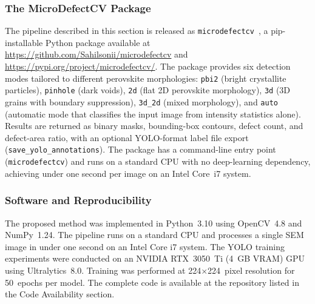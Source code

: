 \documentclass[pdflatex,sn-mathphys-num,iicol]{sn-jnl}
\theoremstyle{thmstyleone}
\theoremstyle{thmstyletwo}
\theoremstyle{thmstylethree}
\begin{document}
\subsubsection{The MicroDefectCV Package}\label{subsec:microdefectcv_pkg}

The pipeline described in this section is released as
\texttt{microdefectcv}~\cite{microdefectcv2025}, a pip-installable
Python package available at
\url{https://github.com/Sahilsonii/microdefectcv} and
\url{https://pypi.org/project/microdefectcv/}. The package provides
six detection modes tailored to different perovskite morphologies:
\texttt{pbi2} (bright crystallite particles),
\texttt{pinhole} (dark voids),
\texttt{2d} (flat 2D perovskite morphology),
\texttt{3d} (3D grains with boundary suppression),
\texttt{3d\_2d} (mixed morphology), and
\texttt{auto} (automatic mode that classifies the input image from
intensity statistics alone). Results are returned as binary masks,
bounding-box contours, defect count, and defect-area ratio, with
an optional YOLO-format label file export
(\texttt{save\_yolo\_annotations}). The package has a command-line
entry point (\texttt{microdefectcv}) and runs on a standard CPU
with no deep-learning dependency, achieving under one second per
image on an Intel Core~i7 system.

\subsubsection{Software and Reproducibility}\label{subsec:software}

The proposed method was implemented in Python~3.10 using OpenCV~4.8
and NumPy~1.24. The pipeline runs on a standard CPU and processes
a single SEM image in under one second on an Intel Core i7 system.
The YOLO training experiments were conducted on an NVIDIA RTX~3050~Ti
(4~GB VRAM) GPU using Ultralytics~8.0. Training was performed at
224$\times$224~pixel resolution for 50~epochs per model. The complete
code is available at the repository listed in the Code Availability
section.
\end{document}
